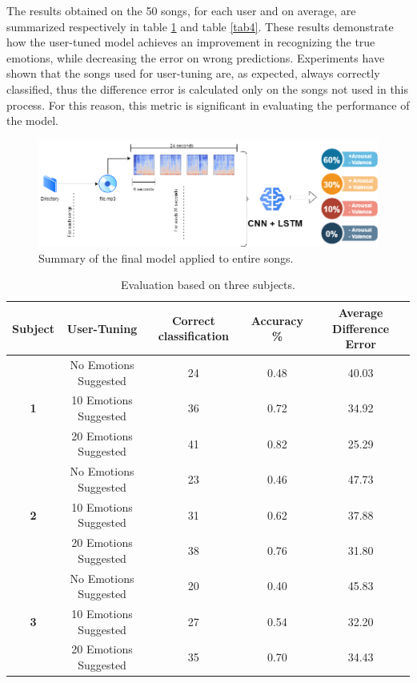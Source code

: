 \documentclass[runningheads]{llncs}
\begin{document}
The results obtained on the 50 songs, for each user and on average, are summarized respectively in table \ref{tab3} and table \ref{tab4}. These results demonstrate how the user-tuned model achieves an improvement in recognizing the true emotions, while decreasing the error on wrong predictions. Experiments have shown that the songs used for user-tuning are, as expected, always correctly classiﬁed, thus the difference error is calculated only on the songs not used in this process. For this reason, this metric is signiﬁcant in evaluating the performance of the model.



\begin{figure}
\centering
\includegraphics[scale = 0.45]{img/evaluation.png}
\caption{Summary of the final model applied to entire songs.}
\label{fig-user-evaluation}
\end{figure}





\begin{table}
\caption{Evaluation based on three subjects.}
\label{tab3}
\centering
\begin{tabular}{|c|c|c|c|c|}
\hline
 \textbf{Subject} & \textbf{User-Tuning} &  \textbf{Correct classification} & \textbf{Accuracy \%}  & \textbf{Average Difference Error}\\
\hline
&No Emotions Suggested &  24  & 0.48 & 40.03\\
 \textbf{1}&10 Emotions Suggested &  36   & 0.72 & 34.92 \\
&20 Emotions Suggested &  41   & 0.82 & 25.29\\
\hline
&No Emotions Suggested &  23  & 0.46 & 47.73\\
 \textbf{2}&10 Emotions Suggested &  31  & 0.62 & 37.88\\
&20 Emotions Suggested &  38  & 0.76 & 31.80\\
\hline
&No Emotions Suggested &  20  & 0.40 & 45.83\\
 \textbf{3}&10 Emotions Suggested &  27  & 0.54 & 32.20\\
&20 Emotions Suggested &  35  & 0.70 & 34.43\\

\hline
\end{tabular}
\end{table}
\end{document}
